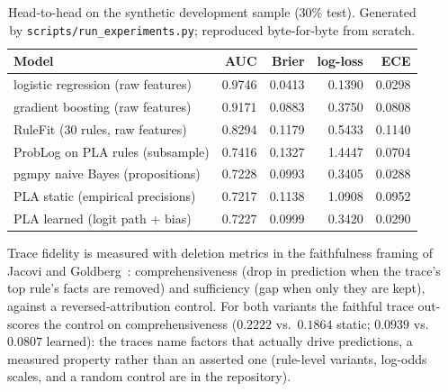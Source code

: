 \documentclass[10pt]{article}
\begin{document}
\begin{table}[t]
\centering
\caption{Head-to-head on the synthetic development sample (30\% test).
Generated by \texttt{scripts/run\_experiments.py}; reproduced
byte-for-byte from scratch.}
\label{tab:headtohead}
\begin{tabular}{lrrrr}
\toprule
Model & AUC & Brier & log-loss & ECE\\
\midrule
logistic regression (raw features) & 0.9746 & 0.0413 & 0.1390 & 0.0298\\
gradient boosting (raw features) & 0.9171 & 0.0883 & 0.3750 & 0.0808\\
RuleFit (30 rules, raw features) & 0.8294 & 0.1179 & 0.5433 & 0.1140\\
ProbLog on PLA rules (subsample) & 0.7416 & 0.1327 & 1.4447 & 0.0704\\
pgmpy naive Bayes (propositions) & 0.7228 & 0.0993 & 0.3405 & 0.0288\\
PLA static (empirical precisions) & 0.7217 & 0.1138 & 1.0908 & 0.0952\\
PLA learned (logit path + bias) & 0.7227 & 0.0999 & 0.3420 & 0.0290\\
\bottomrule
\end{tabular}
\end{table}

Trace fidelity is measured with deletion metrics in the faithfulness
framing of Jacovi and Goldberg~\cite{jacovi2020}: comprehensiveness (drop
in prediction when the trace's top rule's facts are removed) and
sufficiency (gap when only they are kept), against a reversed-attribution
control. For both variants the faithful trace out-scores the control on
comprehensiveness ($0.2222$ vs.\ $0.1864$ static; $0.0939$ vs.\ $0.0807$
learned): the traces name factors that actually drive predictions, a
measured property rather than an asserted one (rule-level variants,
log-odds
scales, and a random control are in the repository).
\end{document}
